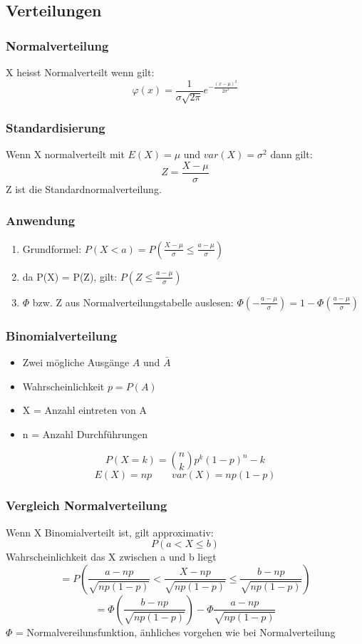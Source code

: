 \documentclass[margin=normal]{tex/hsrzf}
\begin{document}
\subsection{Verteilungen}
\begin{minipage}{0.5\textwidth}
    \subsubsection{Normalverteilung}
    X heisst Normalverteilt wenn gilt:
    $$\varphi(x) = \frac{1}{\sigma \sqrt{2\pi}} e^{-\frac{(x-\mu)^2}{2\sigma^2}}$$
    \subsubsection*{Standardisierung}
    Wenn X normalverteilt mit $E(X) = \mu$ und  \newline $var(X) = \sigma^2$ dann gilt:
    $$Z=\frac{X-\mu}{\sigma}$$
    Z ist die Standardnormalverteilung.
    \subsubsection*{Anwendung}
    \begin{enumerate}
        \item  Grundformel: $P(X<a) = P(\frac{X-\mu}{\sigma} \leq \frac{a-\mu}{\sigma})$
        \item  da P(X) = P(Z), gilt: $P(Z \leq \frac{a-\mu}{\sigma})$
        \item  $\Phi$ bzw. Z aus Normalverteilungstabelle \newline auslesen:
              \newline $\Phi(-\frac{a-\mu}{\sigma}) = 1-\Phi(\frac{a-\mu}{\sigma})$
    \end{enumerate}
\end{minipage}%
\begin{minipage}{0.5\textwidth}
    \subsubsection{Binomialverteilung}
    \begin{itemize}
        \item Zwei mögliche Ausgänge $A$ und $\bar{A}$
        \item Wahrscheinlichkeit $p=P(A)$
        \item X = Anzahl eintreten von A
        \item n = Anzahl Durchführungen
    \end{itemize}
    $$P(X=k) = \binom{n}{k}p^k(1-p)^n-k$$
    $$E(X) = np \qquad var(X) = np(1-p)$$
    \subsubsection*{Vergleich Normalverteilung}
    Wenn X Binomialverteilt ist, gilt approximativ:
    $$P(a<X\leq b)$$
    {\tiny Wahrscheinlichkeit das X zwischen a und b liegt}
    $$= P(\frac{a-np}{\sqrt{np(1-p)}}< \frac{X-np}{\sqrt{np(1-p)}} \leq \frac{b-np}{\sqrt{np(1-p)}})$$
    $$= \Phi(\frac{b-np}{\sqrt{np(1-p)}})- \Phi\frac{a-np}{\sqrt{np(1-p)}}$$
    {\tiny $\Phi$ = Normalvereilunsfunktion, änhliches vorgehen wie bei Normalverteilung}

\end{minipage}
\end{document}
